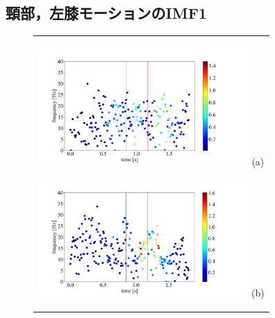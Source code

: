 \subsection{頸部，左膝モーションのIMF1}
\begin{figure}
    \begin{center}
        \begin{tabular}{c}
            \begin{minipage}{0.5\hsize}
                \begin{center}
                    \includegraphics[width=8cm]{./images/straight_data/neck/IMF1.png}
                    (a)
                    \label{straight neck imf1}
                \end{center}
            \end{minipage}

            \begin{minipage}{0.5\hsize}
                \begin{center}
                    \includegraphics[width=8cm]{./images/straight_data/left_leg/IMF1.png}
                    (b)
                    \label{straight left leg imf1}
                \end{center}
            \end{minipage}
        \end{tabular}
    \end{center}
\end{figure}

